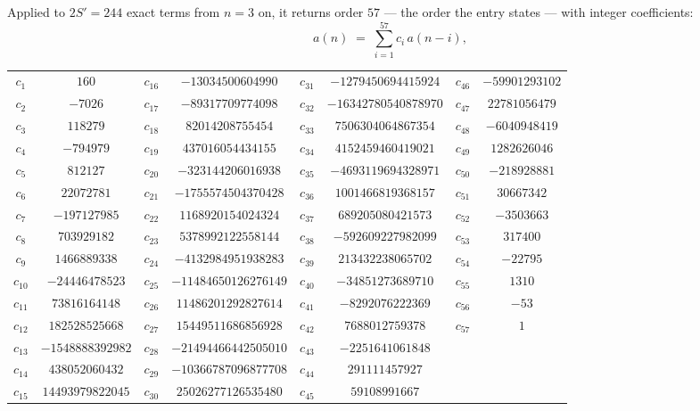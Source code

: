 \documentclass[11pt,a4paper]{article}
\theoremstyle{plain}
\theoremstyle{definition}
\begin{document}
Applied to $2S'=244$ exact terms from $n=3$ on, it returns order $57$ --- the
order the entry states --- with integer coefficients:
\[
a(n)\;=\;\sum_{i=1}^{57}c_i\,a(n-i),
\]
\begin{center}\small
\begin{tabular}{cccccccc}
$c_{1}$ & $160$ & $c_{16}$ & $-13034500604990$ & $c_{31}$ & $-1279450694415924$ & $c_{46}$ & $-59901293102$ \\
$c_{2}$ & $-7026$ & $c_{17}$ & $-89317709774098$ & $c_{32}$ & $-16342780540878970$ & $c_{47}$ & $22781056479$ \\
$c_{3}$ & $118279$ & $c_{18}$ & $82014208755454$ & $c_{33}$ & $7506304064867354$ & $c_{48}$ & $-6040948419$ \\
$c_{4}$ & $-794979$ & $c_{19}$ & $437016054434155$ & $c_{34}$ & $4152459460419021$ & $c_{49}$ & $1282626046$ \\
$c_{5}$ & $812127$ & $c_{20}$ & $-323144206016938$ & $c_{35}$ & $-4693119694328971$ & $c_{50}$ & $-218928881$ \\
$c_{6}$ & $22072781$ & $c_{21}$ & $-1755574504370428$ & $c_{36}$ & $1001466819368157$ & $c_{51}$ & $30667342$ \\
$c_{7}$ & $-197127985$ & $c_{22}$ & $1168920154024324$ & $c_{37}$ & $689205080421573$ & $c_{52}$ & $-3503663$ \\
$c_{8}$ & $703929182$ & $c_{23}$ & $5378992122558144$ & $c_{38}$ & $-592609227982099$ & $c_{53}$ & $317400$ \\
$c_{9}$ & $1466889338$ & $c_{24}$ & $-4132984951938283$ & $c_{39}$ & $213432238065702$ & $c_{54}$ & $-22795$ \\
$c_{10}$ & $-24446478523$ & $c_{25}$ & $-11484650126276149$ & $c_{40}$ & $-34851273689710$ & $c_{55}$ & $1310$ \\
$c_{11}$ & $73816164148$ & $c_{26}$ & $11486201292827614$ & $c_{41}$ & $-8292076222369$ & $c_{56}$ & $-53$ \\
$c_{12}$ & $182528525668$ & $c_{27}$ & $15449511686856928$ & $c_{42}$ & $7688012759378$ & $c_{57}$ & $1$ \\
$c_{13}$ & $-1548888392982$ & $c_{28}$ & $-21494466442505010$ & $c_{43}$ & $-2251641061848$ &  &  \\
$c_{14}$ & $438052060432$ & $c_{29}$ & $-10366787096877708$ & $c_{44}$ & $291111457927$ &  &  \\
$c_{15}$ & $14493979822045$ & $c_{30}$ & $25026277126535480$ & $c_{45}$ & $59108991667$ &  &  \\
\end{tabular}
\end{center}
\end{document}
